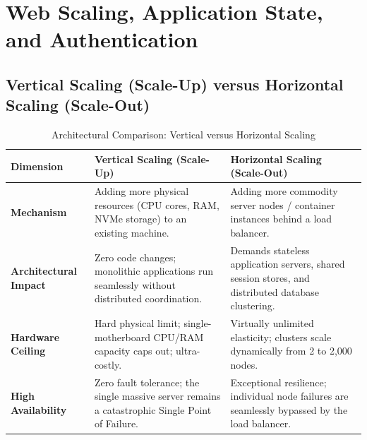 \section{Web Scaling, Application State, and Authentication}
\label{sec:se_scaling_auth}

\subsection{Vertical Scaling (Scale-Up) versus Horizontal Scaling (Scale-Out)}
\begin{table}[htbp]
\centering
\small
\caption{Architectural Comparison: Vertical versus Horizontal Scaling}
\label{tab:vertical_vs_horizontal_scaling}
\begin{tabularx}{\textwidth}{l p{5cm} X}
\toprule
\textbf{Dimension} & \textbf{Vertical Scaling (Scale-Up)} & \textbf{Horizontal Scaling (Scale-Out)} \\
\midrule
\textbf{Mechanism} & Adding more physical resources (CPU cores, RAM, NVMe storage) to an existing machine. & Adding more commodity server nodes / container instances behind a load balancer. \\
\textbf{Architectural Impact} & Zero code changes; monolithic applications run seamlessly without distributed coordination. & Demands stateless application servers, shared session stores, and distributed database clustering. \\
\textbf{Hardware Ceiling} & Hard physical limit; single-motherboard CPU/RAM capacity caps out; ultra-costly. & Virtually unlimited elasticity; clusters scale dynamically from 2 to 2,000 nodes. \\
\textbf{High Availability} & Zero fault tolerance; the single massive server remains a catastrophic Single Point of Failure. & Exceptional resilience; individual node failures are seamlessly bypassed by the load balancer. \\
\bottomrule
\end{tabularx}
\end{table}

